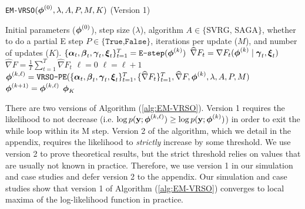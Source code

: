 \begin{algorithm}
\caption{\texttt{EM-VRSO}$(\boldsymbol{\phi}^{(0)},\lambda, A, P, M, K)$ (Version 1)}\label{alg:EM-VRSO}
\begin{algorithmic}[1]
\Require Initial parameters ($\boldsymbol{\phi}^{(0)}$), step size ($\lambda$), algorithm $A \in \{\text{SVRG, SAGA}\}$, whether to do a partial E step $P \in \{\texttt{True,False}\}$, iterations per update ($M$), and number of updates ($K$).
%
\vspace{5pt}
\vspace{5pt}
% 
\State $\{\boldsymbol{\alpha}_{t}, \boldsymbol{\beta}_{t}, \boldsymbol{\gamma}_{t}, \boldsymbol{\xi}_{t}\}_{t=1}^T = \texttt{E-step}(\boldsymbol{\phi}^{(k)})$ 
%
\vspace{5pt}
%
 
    \State $\widehat \nabla F_{t} = \nabla F_t(\boldsymbol{\phi}^{(k)} \mid \boldsymbol{\gamma}_{t}, \boldsymbol{\xi}_{t})$ 
\EndFor
\State $\widehat \nabla F = \frac{1}{T} \sum_{t=1}^T \widehat \nabla F_{t}$
%
\vspace{5pt}
%
\State $\ell = 0$ 
%
%
\State $\ell = \ell+1$
\State $\boldsymbol{\phi}^{(k,\ell)} = \texttt{VRSO-PE}(\{\boldsymbol{\alpha}_t, \boldsymbol{\beta}_t, \boldsymbol{\gamma}_t, \boldsymbol{\xi}_t\}_{t=1}^T,\{\widehat \nabla F_t\}_{t=1}^T, \widehat \nabla F,\boldsymbol{\phi}^{(k)},\lambda,A,P,M)$
%
\EndWhile
\State $\boldsymbol{\phi}^{(k+1)} = \boldsymbol{\phi}^{(k,\ell)}$
\EndFor
\State \Return $\boldsymbol{\phi}_K$
\end{algorithmic}
\end{algorithm}

There are two versions of Algorithm (\ref{alg:EM-VRSO}). Version 1 requires the likelihood to not decrease (i.e. $\log p(\mathbf{y};\boldsymbol{\phi}^{(k,\ell)}) \geq \log p(\mathbf{y};\boldsymbol{\phi}^{(k)})$) in order to exit the while loop within its M step. Version 2 of the algorithm, which we detail in the appendix, requires the likelihood to \textit{strictly} increase by some threshold. We use version 2 to prove theoretical results, but the strict threshold relies on values that are usually not known in practice. Therefore, we use version 1 in our simulation and case studies and defer version 2 to the appendix. Our simulation and case studies show that version 1 of Algorithm (\ref{alg:EM-VRSO}) converges to local maxima of the log-likelihood function in practice. 


